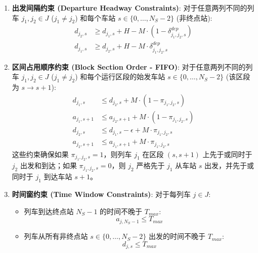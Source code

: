 \documentclass{article}
\begin{document}
\begin{enumerate}
    \item \textbf{出发间隔约束 (Departure Headway Constraints)}:
        对于任意两列不同的列车 $j_1, j_2 \in J$ ($j_1 \neq j_2$) 和每个车站 $s \in
        \{0, \dots, N_S-2\}$ (非终点站):
        \begin{equation}
            \begin{aligned}
                d_{j_2,s} &\ge d_{j_1,s} + H - M \cdot (1 -
                \delta^{dep}_{j_1,j_2,s}) \\
                d_{j_1,s} &\ge d_{j_2,s} + H - M \cdot \delta^{dep}_{j_1,j_2,s}
            \end{aligned}
            \label{eq:departure_headway}
        \end{equation}

    \item \textbf{区间占用顺序约束 (Block Section Order - FIFO)}: 对于任意两列不同的列车
        $j_1, j_2 \in J$ ($j_1 \neq j_2$) 和每个运行区段的始发车站 $s \in \{0,
        \dots, N_S-2\}$ (该区段为 $s \to s+1$):
        \begin{equation}
            \begin{aligned}
                d_{j_1,s} &\le d_{j_2,s} + M \cdot (1 - \pi_{j_1,j_2,s}) \\
                a_{j_1,s+1} &\le a_{j_2,s+1} + M \cdot (1 - \pi_{j_1,j_2,s}) \\
                d_{j_2,s} &\le d_{j_1,s} - \epsilon + M \cdot \pi_{j_1,j_2,s} \\
                a_{j_2,s+1} &\le a_{j_1,s+1} + M \cdot \pi_{j_1,j_2,s}
            \end{aligned}
            \label{eq:block_section_order}
        \end{equation}
        这些约束确保如果 $\pi_{j_1,j_2,s}=1$，则列车 $j_1$ 在区段 $(s, s+1)$ 上先于或同时于
        $j_2$ 出发和到达；如果 $\pi_{j_1,j_2,s}=0$，则 $j_2$ 严格先于 $j_1$ 从车站 $s$
        出发，并先于或同时于 $j_1$ 到达车站 $s+1$。

    \item \textbf{时间窗约束 (Time Window Constraints)}: 对于每列车 $j \in J$:
        \begin{itemize}
            \item 列车到达终点站 $N_S-1$ 的时间不晚于 $T_{max}$:
                \begin{equation}
                    a_{j,N_S-1} \le T_{max}\label{eq:arrival_time_max}
                \end{equation}
            \item 列车从所有非终点站 $s \in \{0, \dots, N_S-2\}$ 出发的时间不晚于 $T_{max}$:
                \begin{equation}
                    d_{j,s} \le T_{max}\label{eq:departure_time_max}
                \end{equation}
        \end{itemize}


\end{enumerate}
\end{document}
